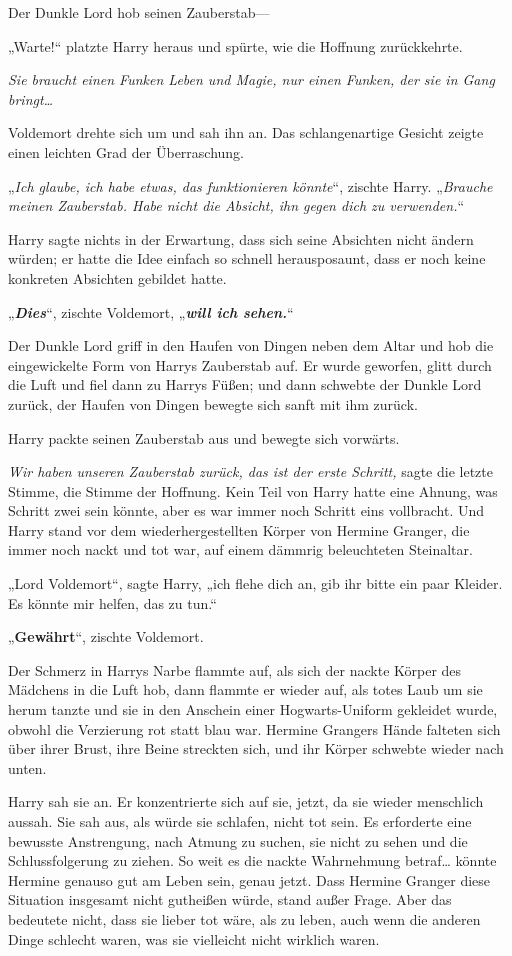 {Der Dunkle Lord hob seinen Zauberstab—

„Warte!“ platzte Harry heraus und spürte, wie die Hoffnung zurückkehrte.

\emph{Sie braucht einen Funken Leben und Magie, nur einen Funken, der sie in Gang bringt…}

Voldemort drehte sich um und sah ihn an. Das schlangenartige Gesicht zeigte einen leichten Grad der Überraschung.

„\emph{Ich glaube, ich habe etwas, das funktionieren könnte}“, zischte Harry. „\emph{Brauche meinen Zauberstab. Habe nicht die Absicht, ihn gegen dich zu verwenden.}“

Harry sagte nichts in der Erwartung, dass sich seine Absichten nicht ändern würden; er hatte die Idee einfach so schnell herausposaunt, dass er noch keine konkreten Absichten gebildet hatte.

„\textbf{\emph{Dies}}“, zischte Voldemort, „\textbf{\emph{will ich sehen.}}“

Der Dunkle Lord griff in den Haufen von Dingen neben dem Altar und hob die eingewickelte Form von Harrys Zauberstab auf. Er wurde geworfen, glitt durch die Luft und fiel dann zu Harrys Füßen; und dann schwebte der Dunkle Lord zurück, der Haufen von Dingen bewegte sich sanft mit ihm zurück.

Harry packte seinen Zauberstab aus und bewegte sich vorwärts.

\emph{Wir haben unseren Zauberstab zurück, das ist der erste Schritt,} sagte die letzte Stimme, die Stimme der Hoffnung. Kein Teil von Harry hatte eine Ahnung, was Schritt zwei sein könnte, aber es war immer noch Schritt eins vollbracht. Und Harry stand vor dem wiederhergestellten Körper von Hermine Granger, die immer noch nackt und tot war, auf einem dämmrig beleuchteten Steinaltar.

„Lord Voldemort“, sagte Harry, „ich flehe dich an, gib ihr bitte ein paar Kleider. Es könnte mir helfen, das zu tun.“

„\textbf{Gewährt}“, zischte Voldemort.

Der Schmerz in Harrys Narbe flammte auf, als sich der nackte Körper des Mädchens in die Luft hob, dann flammte er wieder auf, als totes Laub um sie herum tanzte und sie in den Anschein einer Hogwarts-Uniform gekleidet wurde, obwohl die Verzierung rot statt blau war. Hermine Grangers Hände falteten sich über ihrer Brust, ihre Beine streckten sich, und ihr Körper schwebte wieder nach unten.

Harry sah sie an. Er konzentrierte sich auf sie, jetzt, da sie wieder menschlich aussah. Sie sah aus, als würde sie schlafen, nicht tot sein. Es erforderte eine bewusste Anstrengung, nach Atmung zu suchen, sie nicht zu sehen und die Schlussfolgerung zu ziehen. So weit es die nackte Wahrnehmung betraf… könnte Hermine genauso gut am Leben sein, genau jetzt. Dass Hermine Granger diese Situation insgesamt nicht gutheißen würde, stand außer Frage. Aber das bedeutete nicht, dass sie lieber tot wäre, als zu leben, auch wenn die anderen Dinge schlecht waren, was sie vielleicht nicht wirklich waren.

}

